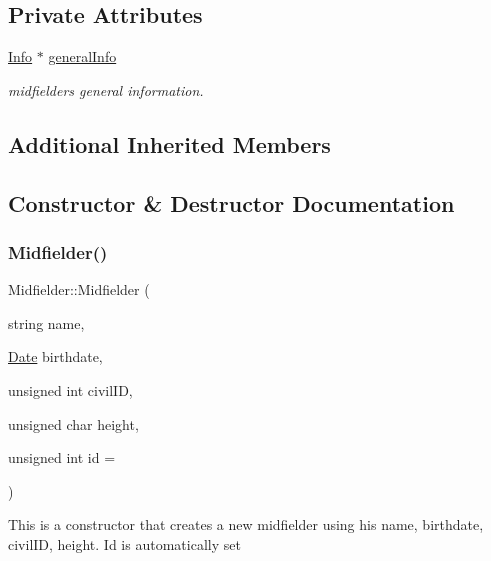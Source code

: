 \subsection*{Private Attributes}
\begin{DoxyCompactItemize}
\item 
\hyperlink{class_info}{Info} $\ast$ \hyperlink{class_midfielder_aa3b78958ffc35755ca4a06aa642115e5}{general\+Info}
\begin{DoxyCompactList}\small\item\em midfielder\textquotesingle{}s general information. \end{DoxyCompactList}\end{DoxyCompactItemize}
\subsection*{Additional Inherited Members}


\subsection{Constructor \& Destructor Documentation}
\hypertarget{class_midfielder_a267913d73597a780ad523d49aadea2f0}{}\label{class_midfielder_a267913d73597a780ad523d49aadea2f0} 
\subsubsection{\texorpdfstring{Midfielder()}{Midfielder()}\hspace{0.1cm}{\footnotesize\ttfamily [1/2]}}
{\footnotesize\ttfamily Midfielder\+::\+Midfielder (\begin{DoxyParamCaption}\item[{string}]{name,  }\item[{\hyperlink{class_date}{Date}}]{birthdate,  }\item[{unsigned int}]{civil\+ID,  }\item[{unsigned char}]{height,  }\item[{unsigned int}]{id = {} }\end{DoxyParamCaption})}

This is a constructor that creates a new midfielder using his name, birthdate, civil\+ID, height. Id is automatically set \hypertarget{class_midfielder_abab63a71a619509011b23eb3e11e099b}{}\label{class_midfielder_abab63a71a619509011b23eb3e11e099b} 
